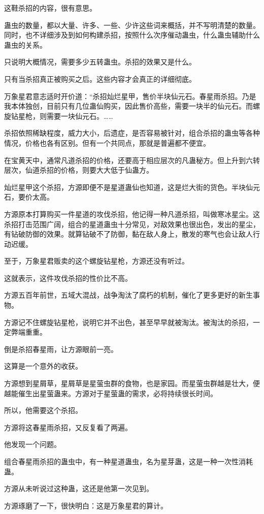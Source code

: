 \begin{this_body}
这鞋杀招的内容，很有意思。

蛊虫的数量，都以大量、许多、一些、少许这些词来概括，并不写明清楚的数量。同时，也不详细涉及到如何构建杀招，按照什么次序催动蛊虫，什么蛊虫辅助什么蛊虫的关系。

只说明大概情况，需要多少五转蛊虫。杀招的效果又是什么。

只有当杀招真正被购买之后。这些内容才会真正的详细彻底。

万象星君意志适时开价道：“杀招灿烂星甲，售价半块仙元石。春星雨杀招。乃是我本体独创，目前只有几位蛊仙购买，因此售价高些，需要一块半的仙元石。而螺旋钻星枪，则需要一块仙元石。……

杀招依照稀缺程度，威力大小，后遗症，是否容易被针对，组合杀招的蛊虫等各种情况，价格也各有区别。但有一个共同点，那就是普遍都不便宜。

在宝黄天中，通常凡道杀招的价格，还要高于相应层次的凡蛊秘方。但上升到六转层次，仙道杀招的价格，则要大大低于仙蛊方。

灿烂星甲这个杀招，方源即便不是星道蛊仙也知道，这是烂大街的货色。半块仙元石，要价太高。

方源原本打算购买一件星道的攻伐杀招，他记得一种凡道杀招，叫做寒冰星尘。这杀招打击范围广阔，组合的星道蛊虫十分常见，对敌效果也很出色，发出的星尘，有钻破防御的效果。就算钻破不了防御，黏在敌人身上，散发的寒气也会让敌人行动迟缓。

至于，万象星君贩卖的这个螺旋钻星枪，方源还没有听过。

这就表示，这件攻伐杀招的性价比不高。

方源五百年前世，五域大混战，战争淘汰了腐朽的机制，催化了更多更好的新生事物。

方源记不住螺旋钻星枪，说明它并不出色，甚至早早就被淘汰。被淘汰的杀招，一定弊端重重。

倒是杀招春星雨，让方源眼前一亮。

这算是一个意外的收获。

方源想到星屑草，星屑草是星萤虫群的食物，也是家园。而星萤虫群越是壮大，便越能催生出星萤蛊来。方源对于星萤蛊的需求，必将持续很长时间。

所以，他需要这个杀招。

方源将这春星雨杀招，又反复看了两遍。

他发现一个问题。

组合春星雨杀招的蛊虫中，有一种星道蛊虫，名为星芽蛊，这是一种一次性消耗蛊。

方源从未听说过这种蛊，这还是他第一次见到。

方源琢磨了一下，很快明白：这是万象星君的算计。


\end{this_body}
